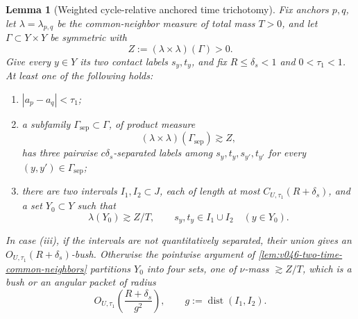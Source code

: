 \documentclass[10pt]{article}
\newtheorem{lemma}[theorem]{Lemma}
\begin{document}
\begin{lemma}[Weighted cycle-relative anchored time trichotomy]
\label{lem:v050-weighted-relative-time-trichotomy}
Fix anchors \(p,q\), let \(\lambda=\lambda_{p,q}\) be the common-neighbor measure of total mass
\(T>0\), and let \(\Gamma\subset Y\times Y\) be symmetric with
\[
Z:=(\lambda\times\lambda)(\Gamma)>0.
\]
Give every \(y\in Y\) its two contact labels \(s_y,t_y\), and fix
\(R\le\delta_s<1\) and \(0<\tau_1<1\).  At least one of the following holds:
\begin{enumerate}[label=\textnormal{(\roman*)}]
\item \(|a_p-a_q|<\tau_1\);
\item a subfamily \(\Gamma_{\mathrm{sep}}\subset\Gamma\), of product measure
\begin{equation}
\label{eq:v050-separated-time-cycle-mass}
(\lambda\times\lambda)(\Gamma_{\mathrm{sep}})
\gtrsim Z,
\end{equation}
has three pairwise \(c\delta_s\)-separated labels among
\(s_y,t_y,s_{y'},t_{y'}\) for every \((y,y')\in\Gamma_{\mathrm{sep}}\);
\item there are two intervals \(I_1,I_2\subset J\), each of length at most
\(C_{U,\tau_1}(R+\delta_s)\), and a set \(Y_0\subset Y\) such that
\begin{equation}
\label{eq:v050-two-time-neighbor-mass}
\boxed{
\lambda(Y_0)
\gtrsim
Z/T,
\qquad
s_y,t_y\in I_1\cup I_2
\quad(y\in Y_0).
}
\end{equation}
\end{enumerate}
In case \textnormal{(iii)}, if the intervals are not quantitatively separated, their union gives an
\(O_{U,\tau_1}(R+\delta_s)\)-bush.  Otherwise the pointwise argument of
\cref{lem:v046-two-time-common-neighbors} partitions \(Y_0\) into four sets, one of
\(\nu\)-mass \(\gtrsim Z/T\), which is a bush or an angular packet of radius
\begin{equation}
\label{eq:v050-weighted-two-time-angular-radius}
\boxed{
O_{U,\tau_1}\!\left(
\frac{R+\delta_s}{g^2}
\right),
\qquad
g:=\operatorname{dist}(I_1,I_2).
}
\end{equation}
\end{lemma}
\end{document}
